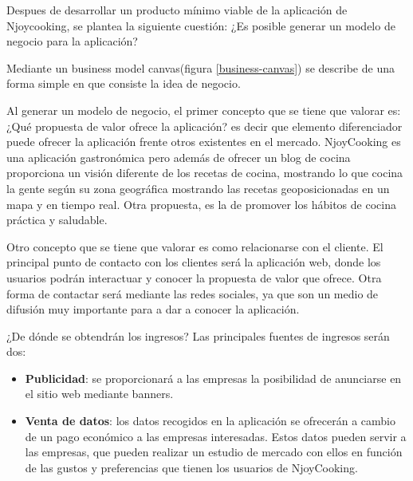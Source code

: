 Despues de desarrollar un producto mínimo viable de la aplicación de Njoycooking, se plantea la siguiente cuestión: ¿Es posible generar un modelo de negocio para la aplicación?

Mediante un business model canvas(figura \ref{business-canvas}) se describe de una forma simple en que consiste la idea de negocio.

\vspace{5 mm}

Al generar un modelo de negocio, el primer concepto que se tiene que valorar es: ¿Qué propuesta de valor ofrece la aplicación? es decir que elemento diferenciador puede ofrecer la aplicación frente otros existentes en el mercado. NjoyCooking es una aplicación gastronómica pero además de ofrecer un blog de cocina proporciona un visión diferente de los recetas de cocina, mostrando lo que cocina la gente según su zona geográfica mostrando las recetas geoposicionadas en un mapa y en tiempo real. Otra propuesta, es la de promover los hábitos de cocina práctica y saludable. 


\vspace{5 mm}

Otro concepto que se tiene que valorar es como relacionarse con el cliente. El principal punto de contacto con los clientes será la aplicación web, donde los usuarios podrán interactuar y conocer la propuesta de valor que ofrece. Otra forma de contactar será mediante las redes sociales, ya que son un medio de difusión muy importante para a dar a conocer la aplicación.

\vspace{5 mm}

¿De dónde se obtendrán los ingresos? Las principales fuentes de ingresos serán dos:

\begin{itemize}

\item \textbf{Publicidad}: se proporcionará a las empresas la posibilidad de anunciarse en el sitio web mediante banners.

\item \textbf{Venta de datos}: los datos recogidos en la aplicación se ofrecerán a cambio de un pago económico a las empresas interesadas. Estos datos pueden servir a las empresas, que pueden realizar un estudio de mercado con ellos en función de las gustos y preferencias que tienen los usuarios de NjoyCooking.

\end{itemize} 

